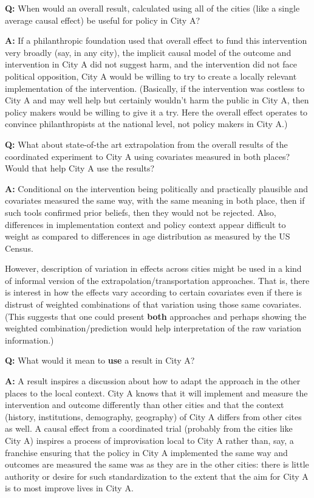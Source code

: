 \documentclass[
  11pt,
]{article}
\begin{document}
\textbf{Q:} When would an overall result, calculated using all of the
cities (like a single average causal effect) be useful for policy in
City A?

\textbf{A:} If a philanthropic foundation used that overall effect to
fund this intervention very broadly (say, in any city), the implicit
causal model of the outcome and intervention in City A did not suggest
harm, and the intervention did not face political opposition, City A
would be willing to try to create a locally relevant implementation of
the intervention. (Basically, if the intervention was costless to City A
and may well help but certainly wouldn't harm the public in City A, then
policy makers would be willing to give it a try. Here the overall effect
operates to convince philanthropists at the national level, not policy
makers in City A.)

\textbf{Q:} What about state-of-the art extrapolation from the overall
results of the coordinated experiment to City A using covariates
measured in both places? Would that help City A use the results?

\textbf{A:} Conditional on the intervention being politically and
practically plausible and covariates measured the same way, with the
same meaning in both place, then if such tools confirmed prior beliefs,
then they would not be rejected. Also, differences in implementation
context and policy context appear difficult to weight as compared to
differences in age distribution as measured by the US Census.

However, description of variation in effects across cities might be used
in a kind of informal version of the extrapolation/transportation
approaches. That is, there is interest in how the effects vary according
to certain covariates even if there is distrust of weighted combinations
of that variation using those same covariates. (This suggests that one
could present \textbf{both} approaches and perhaps showing the weighted
combination/prediction would help interpretation of the raw variation
information.)

\textbf{Q:} What would it mean to \textbf{use} a result in City A?

\textbf{A:} A result inspires a discussion about how to adapt the
approach in the other places to the local context. City A knows that it
will implement and measure the intervention and outcome differently than
other cities and that the context (history, institutions, demography,
geography) of City A differs from other cites as well. A causal effect
from a coordinated trial (probably from the cities like City A) inspires
a process of improvisation local to City A rather than, say, a franchise
ensuring that the policy in City A implemented the same way and outcomes
are measured the same was as they are in the other cities: there is
little authority or desire for such standardization to the extent that
the aim for City A is to most improve lives in City A.
\end{document}
